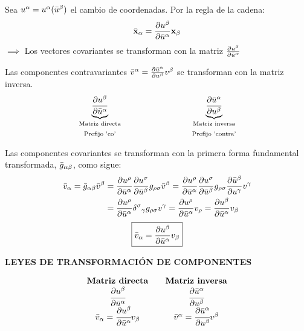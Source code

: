 Sea $u^\alpha =u^\alpha (\Bar{u}^\beta)$ el cambio de coordenadas. Por la regla de la cadena:
$$
\Bar{\mathbf{x}}_\alpha =\pdv{u^\beta }{\Bar{u}^\alpha }\mathbf{x}_\beta 
$$
$
\implies
$ Los vectores covariantes se transforman con la matriz $\pdv{u^\beta }{\Bar{u}^\alpha}$

Las componentes contravariantes $\Bar{v}^\alpha =\pdv{\Bar{u}^\alpha }{u^\beta }v^\beta$ se transforman con la matriz inversa.
$$
\underbrace{\pdv{u^\beta }{\Bar{u}^\alpha }}_{\text{\parbox{4cm}{\centering
Matriz directa\\ Prefijo 'co'}}} \qquad  \underbrace{\pdv{\Bar{u}^\alpha }{u^\beta}}_{\text{\parbox{4cm}{\centering
Matriz inversa\\ Prefijo 'contra'}}}
$$

Las componentes covariantes se transforman con la primera forma fundamental transformada, $\Bar{g}_{\alpha \beta}$, como sigue:
\begin{equation*}
    \begin{split}
        \Bar{v}_\alpha=\Bar{g}_{\alpha \beta} \Bar{v}^\beta &=\pdv{u^\rho }{\Bar{u}^\alpha }\pdv{u^\sigma }{\Bar{u}^\beta }g_{\rho \sigma} \Bar{v}^\beta=\pdv{u^\rho }{\Bar{u}^\alpha }\pdv{u^\sigma }{\Bar{u}^\beta}g_{\rho \sigma }\pdv{\Bar{u}^\beta }{u^\gamma }v^\gamma\\
        &= \pdv{u^\rho }{\Bar{u}^\alpha }\delta ^\sigma{}_\gamma  g_{\rho \sigma }v^\gamma =\pdv{u^\rho }{\Bar{u}^\alpha } v_\rho =\pdv{u^\beta }{\Bar{u}^\alpha }v_\beta
    \end{split}
\end{equation*}
$$
\boxed{\Bar{v}_\alpha =\pdv{u^\beta }{\Bar{u}^\alpha }v_\beta}
$$
\begin{mybox}
    \begin{center}
        \textbf{LEYES DE TRANSFORMACIÓN DE COMPONENTES}
    \end{center}
    $$
    \begin{array}{ccc}
         \text{\textbf{Matriz directa}}&& \text{\textbf{Matriz inversa}} \\
         \cfrac{\partial u^\beta }{\partial \Bar{u}^\alpha }&&\cfrac{\partial \Bar{u}^\alpha }{\partial u^\beta}\\
         \Bar{v}_\alpha =\cfrac{\partial u^\beta }{\partial \Bar{u}^\alpha }v_\beta&&\Bar{v}^\alpha =\cfrac{\partial \Bar{u}^\alpha }{\partial u^\beta }v^\beta 
    \end{array} 
    $$
\end{mybox}

